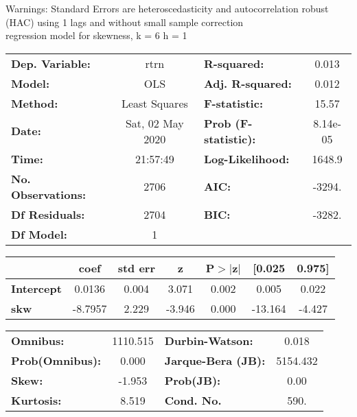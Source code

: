 Warnings: \newline
 [1] Standard Errors are heteroscedasticity and autocorrelation robust (HAC) using 1 lags and without small sample correction\\ 

regression model for skewness, k = 6 h = 1\begin{center}
\begin{tabular}{lclc}
\toprule
\textbf{Dep. Variable:}    &       rtrn       & \textbf{  R-squared:         } &     0.013   \\
\textbf{Model:}            &       OLS        & \textbf{  Adj. R-squared:    } &     0.012   \\
\textbf{Method:}           &  Least Squares   & \textbf{  F-statistic:       } &     15.57   \\
\textbf{Date:}             & Sat, 02 May 2020 & \textbf{  Prob (F-statistic):} &  8.14e-05   \\
\textbf{Time:}             &     21:57:49     & \textbf{  Log-Likelihood:    } &    1648.9   \\
\textbf{No. Observations:} &        2706      & \textbf{  AIC:               } &    -3294.   \\
\textbf{Df Residuals:}     &        2704      & \textbf{  BIC:               } &    -3282.   \\
\textbf{Df Model:}         &           1      & \textbf{                     } &             \\
\bottomrule
\end{tabular}
\begin{tabular}{lcccccc}
                   & \textbf{coef} & \textbf{std err} & \textbf{z} & \textbf{P$> |$z$|$} & \textbf{[0.025} & \textbf{0.975]}  \\
\midrule
\textbf{Intercept} &       0.0136  &        0.004     &     3.071  &         0.002        &        0.005    &        0.022     \\
\textbf{skw}       &      -8.7957  &        2.229     &    -3.946  &         0.000        &      -13.164    &       -4.427     \\
\bottomrule
\end{tabular}
\begin{tabular}{lclc}
\textbf{Omnibus:}       & 1110.515 & \textbf{  Durbin-Watson:     } &    0.018  \\
\textbf{Prob(Omnibus):} &   0.000  & \textbf{  Jarque-Bera (JB):  } & 5154.432  \\
\textbf{Skew:}          &  -1.953  & \textbf{  Prob(JB):          } &     0.00  \\
\textbf{Kurtosis:}      &   8.519  & \textbf{  Cond. No.          } &     590.  \\
\bottomrule
\end{tabular}
\end{center}


